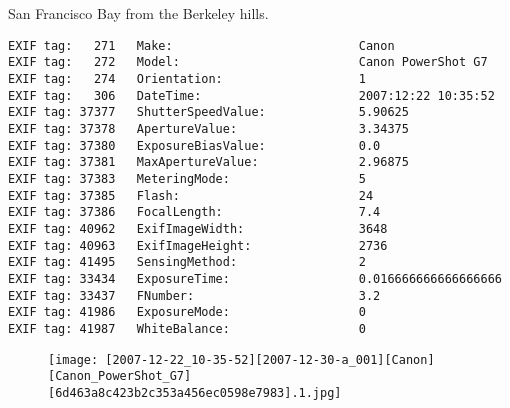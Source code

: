 \section{\protect{}}
\noindent San Francisco Bay from the Berkeley hills.
\noindent
\begin{lstlisting}
EXIF tag:   271   Make:                          Canon
EXIF tag:   272   Model:                         Canon PowerShot G7
EXIF tag:   274   Orientation:                   1
EXIF tag:   306   DateTime:                      2007:12:22 10:35:52
EXIF tag: 37377   ShutterSpeedValue:             5.90625
EXIF tag: 37378   ApertureValue:                 3.34375
EXIF tag: 37380   ExposureBiasValue:             0.0
EXIF tag: 37381   MaxApertureValue:              2.96875
EXIF tag: 37383   MeteringMode:                  5
EXIF tag: 37385   Flash:                         24
EXIF tag: 37386   FocalLength:                   7.4
EXIF tag: 40962   ExifImageWidth:                3648
EXIF tag: 40963   ExifImageHeight:               2736
EXIF tag: 41495   SensingMethod:                 2
EXIF tag: 33434   ExposureTime:                  0.016666666666666666
EXIF tag: 33437   FNumber:                       3.2
EXIF tag: 41986   ExposureMode:                  0
EXIF tag: 41987   WhiteBalance:                  0

\end{lstlisting}
\clearpage
\begin{figure}
\raggedleft
\texttt{[image: [2007-12-22\_10-35-52][2007-12-30-a\_001][Canon][Canon\_PowerShot\_G7][6d463a8c423b2c353a456ec0598e7983].1.jpg]}
\end{figure}


\clearpage
